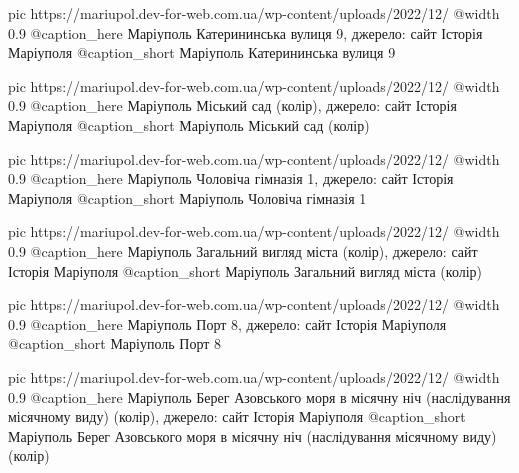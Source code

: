   pic https://mariupol.dev-for-web.com.ua/wp-content/uploads/2022/12/%
  @width 0.9
  @caption_here Маріуполь Катерининська вулиця 9, джерело: сайт Історія Маріуполя
  @caption_short Маріуполь Катерининська вулиця 9

  pic https://mariupol.dev-for-web.com.ua/wp-content/uploads/2022/12/%
  @width 0.9
  @caption_here Маріуполь Міський сад (колір), джерело: сайт Історія Маріуполя
  @caption_short Маріуполь Міський сад (колір)

  pic https://mariupol.dev-for-web.com.ua/wp-content/uploads/2022/12/%
  @width 0.9
  @caption_here Маріуполь Чоловіча гімназія 1, джерело: сайт Історія Маріуполя
  @caption_short Маріуполь Чоловіча гімназія 1

  pic https://mariupol.dev-for-web.com.ua/wp-content/uploads/2022/12/%
  @width 0.9
  @caption_here Маріуполь Загальний вигляд міста (колір), джерело: сайт Історія Маріуполя
  @caption_short Маріуполь Загальний вигляд міста (колір)

  pic https://mariupol.dev-for-web.com.ua/wp-content/uploads/2022/12/%
  @width 0.9
  @caption_here Маріуполь Порт 8, джерело: сайт Історія Маріуполя
  @caption_short Маріуполь Порт 8

  pic https://mariupol.dev-for-web.com.ua/wp-content/uploads/2022/12/%
  @width 0.9
  @caption_here Маріуполь Берег Азовського моря в місячну ніч (наслідування місячному виду) (колір), джерело: сайт Історія Маріуполя
  @caption_short Маріуполь Берег Азовського моря в місячну ніч (наслідування місячному виду) (колір)

